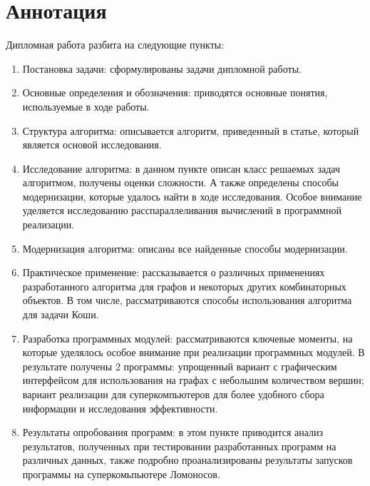 \section*{Аннотация}
\label{sec:Annotation} 
\large

Дипломная работа разбита на следующие пункты:
\begin{enumerate}
\item Постановка задачи: сформулированы задачи дипломной работы.
\item Основные определения и обозначения: приводятся основные понятия, используемые в ходе работы.
\item Структура алгоритма: описывается алгоритм, приведенный в статье, который является основой исследования.
\item Исследование алгоритма: в данном пункте описан класс решаемых задач алгоритмом, получены оценки сложности. А также определены способы модернизации, которые удалось найти в ходе исследования. Особое внимание уделяется исследованию расспараллеливания вычислений в программной реализации.
\item Модернизация алгоритма: описаны все найденные способы модернизации.
\item Практическое применение: рассказывается о различных применениях разработанного алгоритма для графов и некоторых других комбинаторных объектов. В том числе, рассматриваются способы использования алгоритма для задачи Коши.
\item Разработка программных модулей: рассматриваются ключевые моменты, на которые уделялось особое внимание при реализации программных модулей. В результате получены 2 программы: упрощенный вариант с графическим интерфейсом для использования на графах с небольшим количеством вершин; вариант реализации для суперкомпьютеров для более удобного сбора информации и исследования эффективности.
\item Результаты опробования программ: в этом пункте приводится анализ результатов, полученных при тестировании разработанных программ на различных данных, также подробно проанализированы результаты запусков программы на суперкомьпьютере Ломоносов.
\end{enumerate}